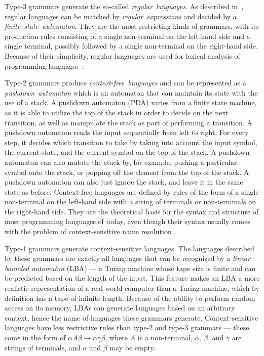 \documentclass[english,bachelors,forcepolishlogotype]{wizthesis}
\begin{document}
Type-3 grammars generate the so-called \emph{regular~languages}. As described
in~\cite{aho-1990}, regular languages can be matched by
\emph{regular~expressions} and decided by a \emph{finite~state~automaton}. They
are the most restricting kinds of grammars, with its production rules consisting
of a single non-terminal on the left-hand side and a single terminal, possibly
followed by a single non-terminal on the right-hand side. Because of their
simplicity, regular languages are used for lexical analysis of programming
languages~\cite{johnson-1968}.

Type-2 grammars produce \emph{context-free~languages} and can be represented as
a \emph{pushdown~automaton} which is an automaton that can maintain its state
with the use of a stack. A pushdown automaton (PDA) varies from a finite state
machine, as it is able to utilize the top of the stack in order to decide on the
next transition, as well as manipulate the stack as part of performing a
transition. A pushdown automaton reads the input sequentially from left to
right. For every step, it decides which transition to take by taking into
account the input symbol, the current state, and the current symbol on the top
of the stack. A pushdown automaton can also mutate the stack by, for example,
pushing a particular symbol onto the stack, or popping off the element from the
top of the stack. A pushdown automaton can also just ignore the stack, and leave
it in the same state as before. Context-free languages are defined by rules of
the form of a single non-terminal on the left-hand side with a string of
terminals or non-terminals on the right-hand side. They are the theoretical
basis for the syntax and structure of most programming languages of today, even
though their syntax usually comes with the problem of context-sensitive name
resolution \cite{hopcroft-2005}.

Type-1 grammars generate context-sensitive languages. The languages described by
these grammars are exactly all languages that can be recognized by a
\emph{linear bounded automaton} (LBA) --- a Turing machine whose tape size is
finite and can be predicted based on the length of the input. This feature makes
an LBA a more realistic representation of a real-world computer than a Turing
machine, which by definition has a tape of infinite length. Because of the
ability to perform random access on its memory, LBAs can generate languages
based on an arbitrary context, hence the name of languages these grammars
generate. Context-sensitive languages have less restrictive rules than type-2
and type-3 grammars --- these come in the form of $\alpha A \beta \rightarrow
\alpha \gamma \beta$, where $A$ is a non-terminal, $\alpha$, $\beta$, and
$\gamma$ are strings of terminals, and $\alpha$ and $\beta$ may be empty.
\end{document}
